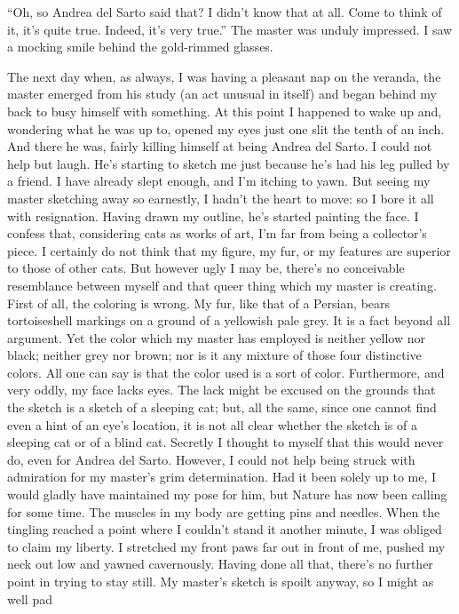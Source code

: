 \documentclass{book}
\begin{document}
``Oh, so Andrea del Sarto said that? I didn't know that at all. Come to
think of it, it's quite true. Indeed, it's very true.'' The master was
unduly impressed. I saw a mocking smile behind the gold-rimmed glasses.

The next day when, as always, I was having a pleasant nap on the
veranda, the master emerged from his study (an act unusual in itself)
and began behind my back to busy himself with something. At this point I
happened to wake up and, wondering what he was up to, opened my eyes
just one slit the tenth of an inch. And there he was, fairly killing
himself at being Andrea del Sarto. I could not help but laugh. He's
starting to sketch me just because he's had his leg pulled by a friend.
I have already slept enough, and I'm itching to yawn. But seeing my
master sketching away so earnestly, I hadn't the heart to move: so I
bore it all with resignation. Having drawn my outline, he's started
painting the face. I confess that, considering cats as works of art, I'm
far from being a collector's piece. I certainly do not think that my
figure, my fur, or my features are superior to those of other cats. But
however ugly I may be, there's no conceivable resemblance between myself
and that queer thing which my master is creating. First of all, the
coloring is wrong. My fur, like that of a Persian, bears tortoiseshell
markings on a ground of a yellowish pale grey. It is a fact beyond all
argument. Yet the color which my master has employed is neither yellow
nor black; neither grey nor brown; nor is it any mixture of those four
distinctive colors. All one can say is that the color used is a sort of
color. Furthermore, and very oddly, my face lacks eyes. The lack might
be excused on the grounds that the sketch is a sketch of a sleeping cat;
but, all the same, since one cannot find even a hint of an eye's
location, it is not all clear whether the sketch is of a sleeping cat or
of a blind cat. Secretly I thought to myself that this would never do,
even for Andrea del Sarto. However, I could not help being struck with
admiration for my master's grim determination. Had it been solely up to
me, I would gladly have maintained my pose for him, but Nature has now
been calling for some time. The muscles in my body are getting pins and
needles. When the tingling reached a point where I couldn't stand it
another minute, I was obliged to claim my liberty. I stretched my front
paws far out in front of me, pushed my neck out low and yawned
cavernously. Having done all that, there's no further point in trying to
stay still. My master's sketch is spoilt anyway, so I might as well pad
\end{document}
